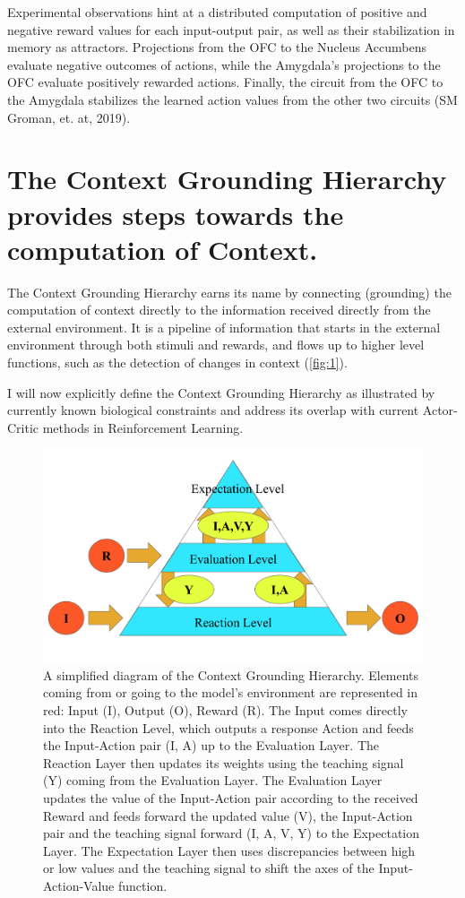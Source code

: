 \documentclass[11pt]{article}
\begin{document}
Experimental observations hint at a distributed computation of positive and negative reward values for each input-output pair, as well as their stabilization in memory as attractors.  Projections from the OFC to the Nucleus Accumbens evaluate negative outcomes of actions, while the Amygdala's projections to the OFC evaluate positively rewarded actions.  Finally, the circuit from the OFC to the Amygdala stabilizes the learned action values from the other two circuits (SM Groman, et. at, 2019).

\section{The Context Grounding Hierarchy provides steps towards the computation of Context.}
The Context Grounding Hierarchy earns its name by connecting (grounding) the computation of context directly to the information received directly from the external environment.  It is a pipeline of information that starts in the external environment through both stimuli and rewards, and flows up to higher level functions, such as the detection of changes in context (\autoref{fig:1}).

I will now explicitly define the Context Grounding Hierarchy as illustrated by currently known biological constraints and address its overlap with current Actor-Critic methods in Reinforcement Learning.  

\begin{figure}
	\centering
	\includegraphics[scale=0.4]{./context_grounding_hierarchy.png}
	\caption{A simplified diagram of the Context Grounding Hierarchy.  Elements coming from or going to the model's environment are represented in red: Input (I), Output (O), Reward (R).  The Input comes directly into the Reaction Level, which outputs a response Action and feeds the Input-Action pair (I, A) up to the Evaluation Layer.  The Reaction Layer then updates its weights using the teaching signal (Y) coming from the Evaluation Layer.  The Evaluation Layer updates the value of the Input-Action pair according to the received Reward and feeds forward the updated value (V), the Input-Action pair and the teaching signal forward (I, A, V, Y) to the Expectation Layer.  The Expectation Layer then uses discrepancies between high or low values and the teaching signal to shift the axes of the Input-Action-Value function. }
	\label{fig:1}
\end{figure}
\end{document}
